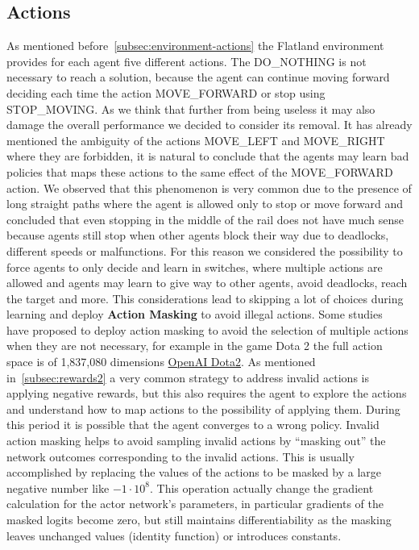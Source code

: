\documentclass[11pt, a4paper, hidelinks]{report}
\begin{document}
\subsection{Actions}\label{subsec:actions}
As mentioned before~\ref{subsec:environment-actions} the Flatland environment provides for each agent five different actions.
The DO\_NOTHING is not necessary to reach a solution, because the agent can continue moving forward deciding each time the action MOVE\_FORWARD or stop using STOP\_MOVING\@.
As we think that further from being useless it may also damage the overall performance we decided to consider its removal.
It has already mentioned the ambiguity of the actions MOVE\_LEFT and MOVE\_RIGHT where they are forbidden, it is natural to conclude that the agents may learn bad policies that maps these actions to the same effect of the MOVE\_FORWARD action.
We observed that this phenomenon is very common due to the presence of long straight paths where the agent is allowed only to stop or move forward and concluded that even stopping in the middle of the rail does not have much sense because agents still stop when other agents block their way due to deadlocks, different speeds or malfunctions.
For this reason we considered the possibility to force agents to only decide and learn in switches, where multiple actions are allowed and agents may learn to give way to other agents, avoid deadlocks, reach the target and more.
This considerations lead to skipping a lot of choices during learning and deploy \textbf{Action Masking} to avoid illegal actions.
Some studies~\citep{ppo_action_masking} have proposed to deploy action masking to avoid the selection of multiple actions when they are not necessary, for example in the game Dota 2 the full action space is of 1,837,080 dimensions \href{https://cdn.openai.com/dota-2.pdf}{OpenAI Dota2}.
As mentioned in~\ref{subsec:rewards2} a very common strategy to address invalid actions is applying negative rewards, but this also requires the agent to explore the actions and understand how to map actions to the possibility of applying them.
During this period it is possible that the agent converges to a wrong policy.
Invalid action masking helps to avoid sampling invalid actions by ``masking out'' the network outcomes corresponding to the invalid actions.
This is usually accomplished by replacing the values of the actions to be masked by a large negative number like $-1 \cdot 10^8$.
This operation actually change the gradient calculation for the actor network's parameters, in particular gradients of the masked logits become zero, but still maintains differentiability as the masking leaves unchanged values (identity function) or introduces constants.
\end{document}
